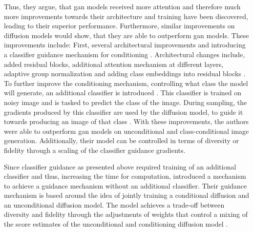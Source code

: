 Thus, they argue, that \gls{gan} models received more attention and therefore much more improvements towards their architecture and training have been discovered, leading to their superior performance.
Furthermore, similar improvements on diffusion models would show, that they are able to outperform \gls{gan} models.
These improvements include:
First, several architectural improvements \cite[section 3]{dhariwal2021DiffusionModelsBeat} and introducing a classifier guidance mechanism for conditioning \cite[section 4]{dhariwal2021DiffusionModelsBeat}.
Architectural changes include, added residual blocks, additional attention mechanism at different layers, adaptive group normalization and adding class embeddings into residual blocks \cite{dhariwal2021DiffusionModelsBeat}.
To further improve the conditioning mechanism, \ie controlling what class the model will generate, an additional classifier is introduced \cite{dhariwal2021DiffusionModelsBeat}. 
This classifier is trained on noisy image and is tasked to predict the class of the image.
During sampling, the gradients produced by this classifier are used by the diffusion model, to guide it towards producing an image of that class \cite{dhariwal2021DiffusionModelsBeat}.
With these improvements, the authors were able to outperform \gls{gan} models on unconditional and class-conditional image generation.
Additionally, their model can be controlled in terms of diversity or fidelity through a scaling of the classifier guidance gradients.

Since classifier guidance as presented above required training of an additional classifier and thus, increasing the time for computation, \cite{ho2022ClassifierFreeDiffusionGuidance}
introduced a mechanism to achieve a guidance mechanism without an additional classifier.  
Their guidance mechanism is based around the idea of jointly training a conditional diffusion and an unconditional diffusion model.
The model achieves a trade-off between diversity and fidelity through the adjustments of weights that control a mixing of the score estimates of the unconditional and conditioning diffusion model \cite{ho2022ClassifierFreeDiffusionGuidance}.

